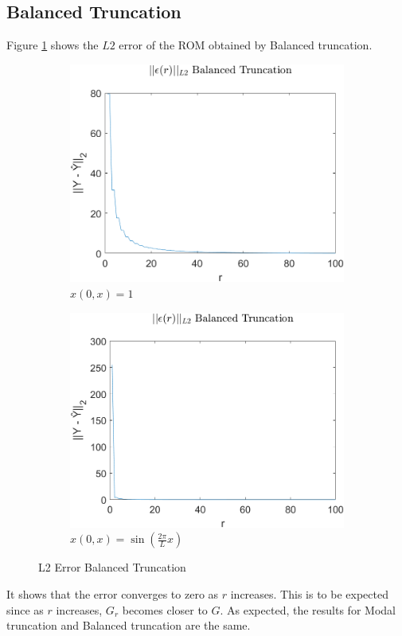 \subsection{Balanced Truncation}
Figure \ref{FIG-ERR-BT} shows the \(L2\) error of the ROM obtained by Balanced truncation.
\begin{figure}[H]
\begin{subfigure}[b]{0.5\textwidth}
\centering
\includegraphics[width=\textwidth]{images/L2_BT}
\caption{$x(0, x) = 1$}
\label{FIG-ERR-BT}
\end{subfigure}
\begin{subfigure}[b]{0.5\textwidth}
\centering
\includegraphics[width=\textwidth]{images/L2_BT_SIN}
\caption{$x(0, x) = \sin(\frac{2\pi}{L}x)$}
\label{FIG-ERR-BT-SIN}
\end{subfigure}
\caption{L2 Error Balanced Truncation}
\end{figure}
It shows that the error converges to zero as \(r\) increases.
This is to be expected since as \(r\) increases, \(G_r\) becomes closer to \(G\).
As expected, the results for Modal truncation and Balanced truncation are the same.

